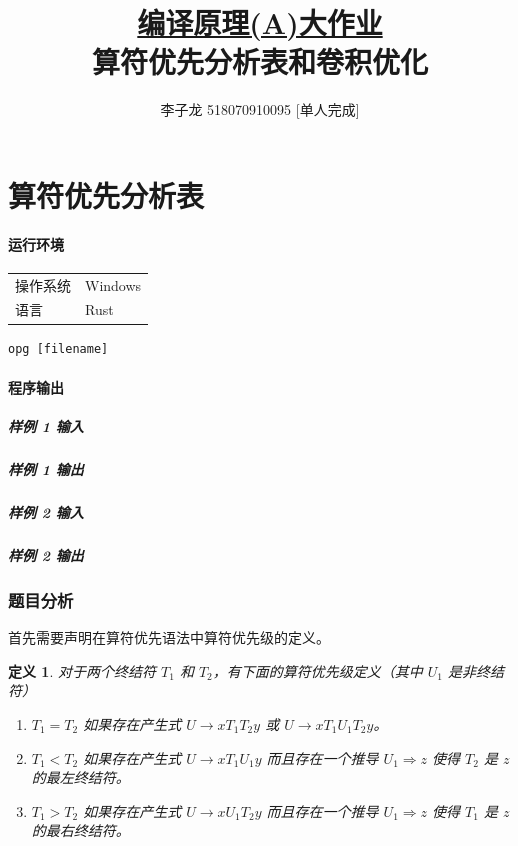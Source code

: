 \documentclass[UTF8]{ctexart}
\title{\normalsize\underline{编译原理(A)大作业}\\\Large 算符优先分析表和卷积优化}
\author{李子龙 518070910095 [单人完成]}
\newtheorem{definition}{定义}
\begin{document}
    \maketitle 
    \tableofcontents
    \clearpage

\part{算符优先分析表}
\subsection*{运行环境}
\begin{tabular}{ll}
    操作系统 & Windows \\
    语言 & Rust\cite{SteveKlabnik2019} \\
\end{tabular}
\vspace*{1em}
\begin{lstlisting}[frameround=fttt]
    opg [filename]
\end{lstlisting}
\subsection*{程序输出}
\subsubsection*{样例 1 输入}

\subsubsection*{样例 1 输出}

\subsubsection*{样例 2 输入}

\subsubsection*{样例 2 输出}


\section{题目分析}

首先需要声明在算符优先语法中算符优先级的定义\cite{Floyd1963}。
\begin{definition}\label{def:op}
    对于两个终结符 $T_1$ 和 $T_2$，有下面的算符优先级定义（其中 $U_1$ 是非终结符）
    \begin{enumerate}
        \item $T_1=T_2$ 如果存在产生式 $U\rightarrow xT_1T_2y$ 或 $U\rightarrow xT_1 U_1 T_2 y$。
        \item $T_1<T_2$ 如果存在产生式 $U\rightarrow xT_1U_1y$ 而且存在一个推导 $U_1\Rightarrow z$ 使得 $T_2$ 是 $z$ 的最左终结符。
        \item $T_1>T_2$ 如果存在产生式 $U\rightarrow xU_1T_2y$ 而且存在一个推导 $U_1\Rightarrow z$ 使得 $T_1$ 是 $z$ 的最右终结符。
    \end{enumerate}
\end{definition}
\end{document}
